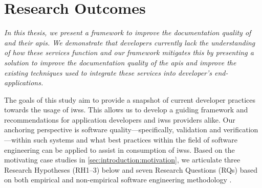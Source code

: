 \section{Research Outcomes}
\label{sec:introduction:hypohtesis}

\begin{framed}
\itshape
\noindent
In this thesis, we present a framework to improve the documentation quality of  and their \glspl{api}. We demonstrate that developers currently lack the understanding of how these services function and our framework mitigates this by presenting a solution to improve the documentation quality of the \glspl{api} and improve the existing techniques used to integrate these services into developer's end-applications.
\end{framed}

\upshape
\bigskip

The goals of this study aim to provide a snapshot of current developer practices towards the usage of \glspl{iws}. This allows us to develop a guiding framework and recommendations for application developers and \glspl{iws} providers alike. Our anchoring perspective is software quality---specifically, validation and verification---within such systems and what best practices within the field of software engineering can be applied to assist in consumption of \glspl{iws}.
 Based on the motivating case studies in \cref{sec:introduction:motivation}, we articulate three Research Hypotheses (RH1--3) below and seven Research Questions (RQs) based on  both empirical and non-empirical software engineering methodology \citep{Shull:2007vh,Simon:1996uw}.

\newcommand{\rh}[1]{\hyperref[rh#1]{RH#1}}

